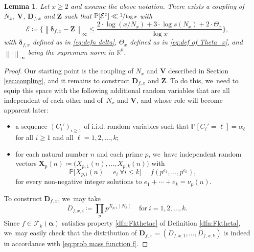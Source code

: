 \documentclass[JEP,XML,SOM,Unicode,published]{cedram}
\newcommand{\bD}{{\boldsymbol D}}
\newcommand{\bV}{{\boldsymbol V}}
\newcommand{\bX}{{\boldsymbol X}}
\newcommand{\bZ}{{\boldsymbol Z}}
\newcommand{\RR}{\mathbb{R}}
\newcommand{\PP}{\mathbb{P}}
\newcommand{\boldalpha}{\boldsymbol{\alpha}}
\newcommand{\bolddelta}{\boldsymbol{\delta}}
\newcommand{\maxnorm}[1]{\left\| #1 \right\|_{\infty}}
\newcommand{\bg}{\big}
\newcommand{\bgg}{\Big}
\theoremstyle{plain}
\newtheorem{lem}[cor]{Lemma}
\theoremstyle{definition}
\begin{document}
\begin{lem}
\label{lem:coupling for factorizations}
Let $x\ge2$ and assume the above notation. There exists a coupling of $N_x$, $\bV$, $\bD_{f, x}$ and $\bZ$ such that $\PP[\mathcal E^c] \ll \sfrac{1}{\log x}$ with
\[
\mathcal E \coloneqq \bgg\{\maxnorm{\bolddelta_{f, x} - \bZ} \le \frac{2 \cdot \log(x/N_x) + 3 \cdot \log s(N_x) + 2\cdot \Theta_x}{\log x}\bgg\},
\]
with $\bolddelta_{f, x}$ defined as in \eqref{eq:defn delta}, $\Theta_x$ defined as in \eqref{eq:def of Theta_x}, and $\maxnorm \cdot$ being the supremum norm in $\RR^k$.
\end{lem}

\begin{proof} Our starting point is the coupling of $N_x$ and $\bV$ described in Section \ref{sec:coupling}, and it remains to construct $\bD_{f, x}$ and $\bZ$. To do this, we~need to equip this space with the following additional random variables that are all independent of each other and of~$N_x$ and $\bV$, and whose role will become apparent later:
\begin{itemize}
\item a sequence $(C_i')_{i\ge1}$ of i.i.d. random variables such that $\PP[C_i'=\ell]=\alpha_\ell$ for all $i\ge1$ and all $\ell=1,2,\dots,k$;
\item for each natural number $n$ and each prime $p$, we~have independent random vectors $\bX_{p}(n) \coloneqq \bg(X_{p, 1}(n), \ldots, X_{p, k}(n)\bg)$ with
\[
\PP\bg[X_{p, i}(n) = e_i \ \forall i \le k\bg] = f(p^{e_1}, \ldots, p^{e_k}),
\]
for every non-negative integer solutions to $e_1+\cdots + e_k = \nu_p(n)$.
\end{itemize}

To construct $\bD_{f, x}$, we~may take
\[
D_{f,x,i} \coloneqq \prod_{p} p^{X_{p, i}(N_x)}\quad\text{for}\ i=1,2,\dots,k.
\]
Since $f \in \mathcal F_k(\boldalpha)$ satisfies property \eqref{dfn:Fkthetac} of Definition \ref{dfn:Fktheta}, we~may easily check that the distribution of $\bD_{f, x}=(D_{f,x,1},\dots,D_{f,x,k})$ is indeed in accordance with \eqref{eq:prob mass function f}.


\end{proof}
\end{document}

